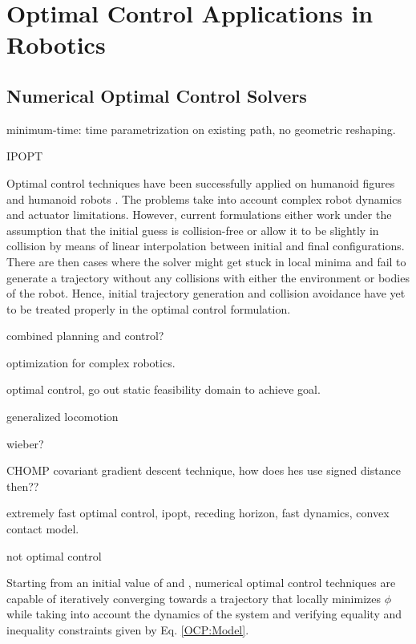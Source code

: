\section{Optimal Control Applications in Robotics}

\subsection{Numerical Optimal Control Solvers}

\cite{verscheure2009time,suleiman2010time} minimum-time: time
parametrization on existing path, no geometric reshaping.

\cite{suleiman2008human}

\textsc{IPOPT}

Optimal control techniques have been successfully applied on humanoid
figures \cite{Schultz2010} and humanoid robots \cite{Toussaint2007,
  Lengagne2010}. The problems take into account complex robot dynamics
and actuator limitations. However, current formulations either work
under the assumption that the initial guess is collision-free or allow
it to be slightly in collision by means of linear interpolation
between initial and final configurations. There are then cases where
the solver might get stuck in local minima and fail to generate a
trajectory without any collisions with either the environment or
bodies of the robot. Hence, initial trajectory generation and
collision avoidance have yet to be treated properly in the optimal
control formulation.

\cite{quinlan1993elastic} \cite{brock2002elastic} combined planning
and control?

\cite{miossec2006development} optimization for complex robotics.

\cite{arisumi2008dynamic} optimal control, go out static feasibility
domain to achieve goal.

\cite{coros2010generalized} \cite{mordatch2012discovery} generalized
locomotion

wieber?

\cite{chevallereau2001optimal}

\textsc{CHOMP} \cite{ratliff2009chomp} covariant gradient descent
technique, how does hes use signed distance then??

\cite{tassa2012synthesis} extremely fast optimal control, ipopt,
receding horizon, fast dynamics, convex contact model.

\cite{saab-tro-12} not optimal control

Starting from an initial value of \state{} and \control{}, numerical
optimal control techniques are capable of iteratively converging
towards a trajectory that locally minimizes $\phi$ while taking into
account the dynamics of the system and verifying equality and
inequality constraints given by Eq. \ref{OCP:Model}.

